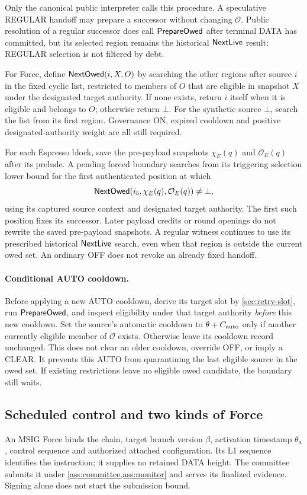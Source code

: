 Only the canonical public interpreter calls this procedure. A
speculative REGULAR handoff may prepare a successor without changing
$\mathcal O$. Public resolution of a regular successor does call
$\mathsf{PrepareOwed}$ after terminal DATA has committed, but its selected
region remains the historical
$\mathsf{NextLive}$ result: REGULAR selection is not filtered by debt.

For Force, define $\mathsf{NextOwed}(i,X,O)$ by searching the other
regions after source $i$ in the fixed cyclic list, restricted to
members of $O$ that are eligible in snapshot $X$ under the designated
target authority. If none exists, return $i$ itself when it is eligible
and belongs to $O$; otherwise return $\bot$. For the synthetic source
$\bot$, search the list from its first region. Governance ON,
expired cooldown and positive designated-authority weight are all
still required.

For each Espresso block, save the pre-payload snapshots
$\chi_E(q)$ and $\mathcal O_E(q)$ after its prelude. A pending forced
boundary searches from its triggering selection lower bound for the
first authenticated position at which
\[
 \mathsf{NextOwed}(i_b,\chi_E(q),\mathcal O_E(q))\ne\bot,
\]
using its captured source context and designated target authority.
The first such position fixes its successor. Later payload credits or
round openings do not rewrite the saved pre-payload snapshots. A
regular witness continues to use its prescribed historical
$\mathsf{NextLive}$ search, even when that region is outside the current
owed set. An ordinary OFF does not revoke an already fixed handoff.

\paragraph{Conditional AUTO cooldown.}
Before applying a new AUTO cooldown, derive its target slot by
\cref{sec:retry-slot}, run $\mathsf{PrepareOwed}$, and inspect eligibility
under that target authority \emph{before} this new cooldown. Set the
source's automatic cooldown to $\theta+C_{\rm auto}$ only if another
currently eligible member of $\mathcal O$ exists. Otherwise leave its
cooldown record unchanged. This does not clear an older cooldown,
override OFF, or imply a CLEAR. It prevents this AUTO from quarantining
the last eligible source in the owed set. If existing restrictions
leave no eligible owed candidate, the boundary still waits.

\subsection{Scheduled control and two kinds of Force}
\label{sec:force-stages}
An MSIG Force binds the chain, target branch version $\beta$,
activation timestamp $\theta_a$, control sequence and authorized
attached configuration. Its L1 sequence identifies the instruction;
it supplies no retained DATA height. The committee submits it under
\cref{ass:committee,ass:monitor} and serves its finalized evidence.
Signing alone does not start the submission bound.

